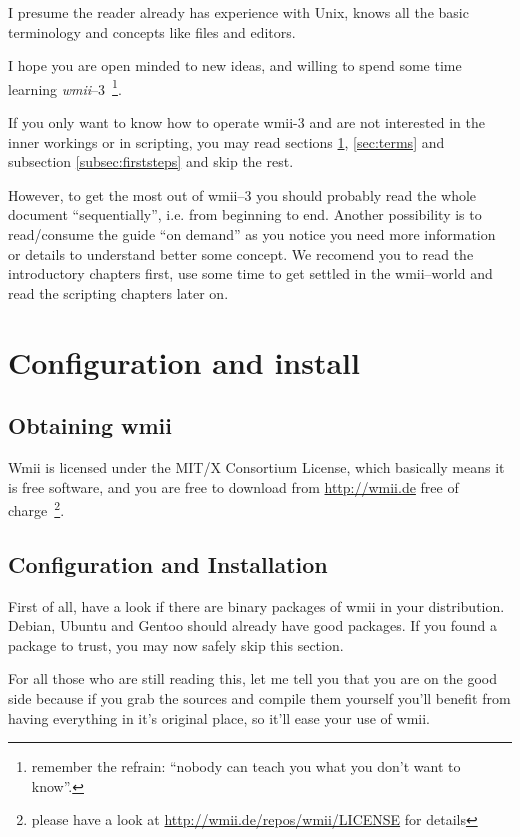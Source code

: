\documentclass[12pt,a4paper]{article} %
\newcommand{\hrefx}[1]{\href{#1}{#1}} %
\newcommand{\wmii}{\emph{wmii}}
\begin{document}
    I presume the reader already has experience with Unix, knows all
    the basic terminology and concepts like files and editors.

    I hope you are open minded to new ideas, and willing to spend some
    time learning \wmii--3~\footnote{remember the refrain: ``nobody
    can teach you what you don't want to know''.}.

    If you only want to know how to operate wmii-3 and are not
    interested in the inner workings or in scripting, you may read
    sections \ref{sec:conf&install}, \ref{sec:terms} and subsection
    \ref{subsec:firststeps} and skip the rest.

    However, to get the most out of wmii--3 you should probably read
    the whole document ``sequentially'', i.e. from beginning to end.
    Another possibility is to read/consume the guide ``on demand'' as
    you notice you need more information or details to understand
    better some concept. We recomend you to read the introductory
    chapters first, use some time to get settled in the wmii--world
    and read the scripting chapters later on.
    
    \section{Configuration and install}
    \label{sec:conf&install}

    \subsection{Obtaining wmii}

    Wmii is licensed under the MIT/X Consortium License, which
    basically means it is free software, and you are free to download
    from \hrefx{http://wmii.de} free of charge~\footnote{ please have
      a look at \hrefx{http://wmii.de/repos/wmii/LICENSE}  for
      details}.
    
    \subsection{Configuration and Installation}
    
    First of all, have a look if there are binary packages of wmii in
    your distribution. Debian, Ubuntu and Gentoo should already have
    good packages. If you found a package to trust, you may now safely
    skip this section.

    For all those who are still reading this, let me tell you that you are
    on the good side because if you grab the sources and compile them yourself
    you'll benefit from having everything in it's original place, so
    it'll ease your use of wmii.
    
\end{document}
